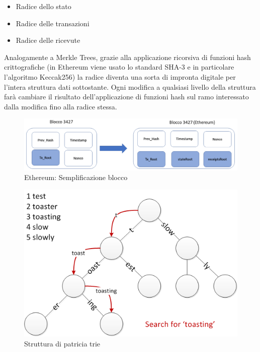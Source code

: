 \begin{itemize}
\item Radice dello stato
\item Radice delle transazioni
\item Radice delle ricevute
\end{itemize}

Analogamente a Merkle Trees, grazie alla applicazione ricorsiva di funzioni hash crittografiche (in Ethereum viene usato lo standard SHA-3 e in particolare l'algoritmo Keccak256) la radice diventa una sorta di impronta digitale per l'intera struttura dati sottostante. Ogni modifica a qualsiasi livello della struttura farà cambiare il risultato dell'applicazione di funzioni hash sul ramo interessato dalla modifica fino alla radice stessa. 

\begin{figure}[H]
\centering
\includegraphics[width=1\textwidth]{immagini/EthBlockSimplified.png}
\caption{Ethereum: Semplificazione blocco}
\label{fig:EthBlock}
\end{figure}


\begin{figure}[H]
\centering
\includegraphics[width=1\textwidth]{immagini/patricia_trie.png}
\caption{Struttura di patricia trie}
\label{fig:mesh6}
\end{figure}

